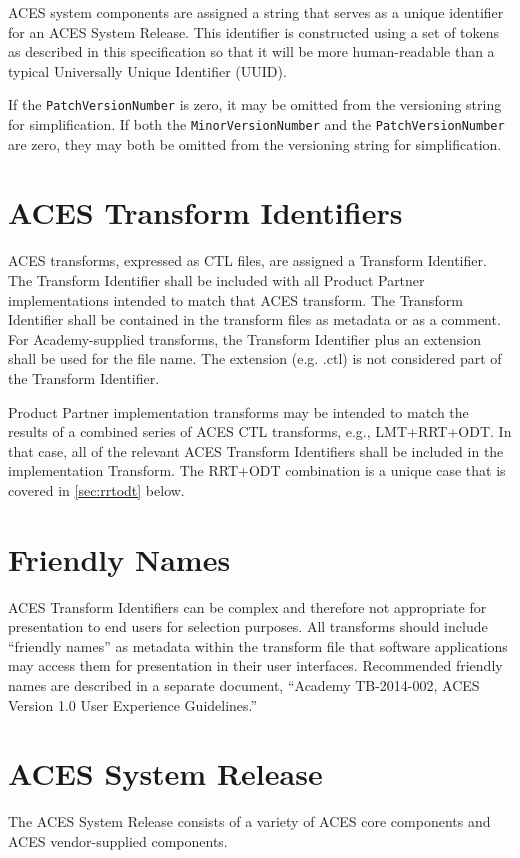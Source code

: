 ACES system components are assigned a string that serves as a unique identifier for an ACES System Release. This identifier is constructed using a set of tokens as described in this specification so that it will be more human-readable than a typical Universally Unique Identifier (UUID).

If the \texttt{PatchVersionNumber} is zero, it may be omitted from the versioning string for simplification. If both the \texttt{MinorVersionNumber} and the \texttt{PatchVersionNumber} are zero, they may both be omitted from the versioning string for simplification.

\section{ACES Transform Identifiers}
ACES transforms, expressed as CTL files, are assigned a Transform Identifier.  The Transform Identifier shall be included with all Product Partner implementations intended to match that ACES transform. The Transform Identifier shall be contained in the transform files as metadata or as a comment. For Academy-supplied transforms, the Transform Identifier plus an extension shall be used for the file name. The extension (e.g. .ctl) is not considered part of the Transform Identifier.

Product Partner implementation transforms may be intended to match the results of a combined series of ACES CTL transforms, e.g., LMT+RRT+ODT.  In that case, all of the relevant ACES Transform Identifiers shall be included in the implementation Transform. The RRT+ODT combination is a unique case that is covered in \autoref{sec:rrtodt} below.

\section{Friendly Names}
ACES Transform Identifiers can be complex and therefore not appropriate for presentation to end users for selection purposes. All transforms should include ``friendly names'' as metadata within the transform file that software applications may access them for presentation in their user interfaces. Recommended friendly names are described in a separate document, ``Academy TB-2014-002, ACES Version 1.0 User Experience Guidelines.''

\section{ACES System Release}
The ACES System Release consists of a variety of ACES core components and ACES vendor-supplied components.

